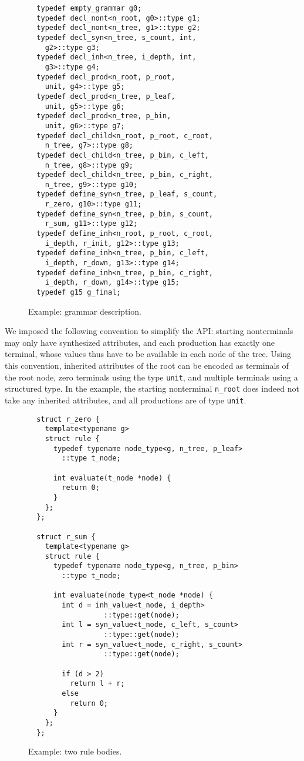\documentclass{llncs}
\begin{document}
  \begin{figure}[tb]
  \begin{lstlisting}
  typedef empty_grammar g0;
  typedef decl_nont<n_root, g0>::type g1;
  typedef decl_nont<n_tree, g1>::type g2;
  typedef decl_syn<n_tree, s_count, int,
    g2>::type g3;
  typedef decl_inh<n_tree, i_depth, int,
    g3>::type g4;
  typedef decl_prod<n_root, p_root,
    unit, g4>::type g5;
  typedef decl_prod<n_tree, p_leaf,
    unit, g5>::type g6;
  typedef decl_prod<n_tree, p_bin,
    unit, g6>::type g7;
  typedef decl_child<n_root, p_root, c_root,
    n_tree, g7>::type g8;
  typedef decl_child<n_tree, p_bin, c_left,
    n_tree, g8>::type g9;
  typedef decl_child<n_tree, p_bin, c_right,
    n_tree, g9>::type g10;
  typedef define_syn<n_tree, p_leaf, s_count,
    r_zero, g10>::type g11;
  typedef define_syn<n_tree, p_bin, s_count,
    r_sum, g11>::type g12;
  typedef define_inh<n_root, p_root, c_root,
    i_depth, r_init, g12>::type g13;
  typedef define_inh<n_tree, p_bin, c_left,
    i_depth, r_down, g13>::type g14;
  typedef define_inh<n_tree, p_bin, c_right,
    i_depth, r_down, g14>::type g15;
  typedef g15 g_final;
  \end{lstlisting}
  \caption{Example: grammar description.}
  \label{fig:example:grammar}
  \end{figure}

  We imposed the following convention to simplify the API: starting
  nonterminals may only have synthesized attributes, and each production
  has exactly one terminal, whose values thus have to be available in
  each node of the tree. Using this convention, inherited attributes
  of the root can be encoded as terminals of the root node, zero
  terminals using the type \lstinline$unit$, and multiple terminals
  using a structured type. In the example, the starting nonterminal
  \lstinline$n_root$ does indeed not take any inherited attributes,
  and all productions are of type \lstinline$unit$.

  \begin{figure}[tb]
  \begin{lstlisting}
  struct r_zero {
    template<typename g>
    struct rule {
      typedef typename node_type<g, n_tree, p_leaf>
        ::type t_node;

      int evaluate(t_node *node) {
        return 0;
      }
    };
  };

  struct r_sum {
    template<typename g>
    struct rule {
      typedef typename node_type<g, n_tree, p_bin>
        ::type t_node;

      int evaluate(node_type<t_node *node) {
        int d = inh_value<t_node, i_depth>
                  ::type::get(node);
        int l = syn_value<t_node, c_left, s_count>
                  ::type::get(node);
        int r = syn_value<t_node, c_right, s_count>
                  ::type::get(node);

        if (d > 2)
          return l + r;
        else
          return 0;
      }
    };
  };
  \end{lstlisting}
  \caption{Example: two rule bodies.}
  \label{fig:example:rules}
  \end{figure}
\end{document}
